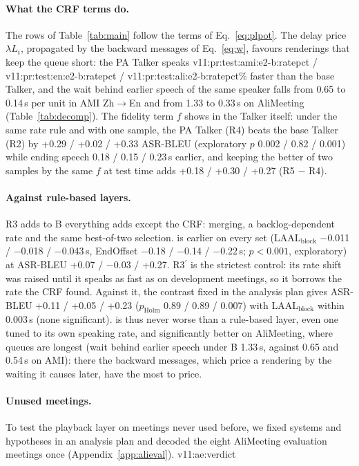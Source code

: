 \paragraph{What the CRF terms do.} The rows of Table~\ref{tab:main} follow the terms of Eq.~\eqref{eq:plpot}. The delay
price $\lambda L_i$, propagated by the backward messages of Eq.~\eqref{eq:w}, favours renderings that keep the queue
short: the PA Talker speaks \num{v11:pr:test:ami:e2-b:ratepct} / \num{v11:pr:test:en:e2-b:ratepct} /
\num{v11:pr:test:ali:e2-b:ratepct}\% faster than the base Talker, and the wait behind earlier speech of the same
speaker falls from 0.65 to 0.14\,s per unit in AMI Zh$\rightarrow$En and from 1.33 to 0.33\,s on AliMeeting
(Table~\ref{tab:decomp}). The fidelity term $f$ shows in the Talker itself: under the same rate rule and with one sample,
the PA Talker (R4) beats the base Talker (R2) by +0.29 / +0.02 / +0.33 ASR-BLEU (exploratory $p$ 0.002 / 0.82 /
0.001) while ending speech 0.18 / 0.15 / 0.23\,s earlier, and keeping the better of two samples by the same $f$ at test
time adds +0.18 / +0.30 / +0.27 (R5 $-$ R4).

\paragraph{Against rule-based layers.} R3 adds to B everything \sys{} adds except the CRF: merging, a backlog-dependent
rate and the same best-of-two selection. \sys{} is earlier on every set (LAAL$_\text{block}$ $-$0.011 / $-$0.018 /
$-$0.043\,s, EndOffset $-$0.18 / $-$0.14 / $-$0.22\,s; $p<0.001$, exploratory) at ASR-BLEU +0.07 / $-$0.03 / +0.27.
R3$^\prime$ is the strictest control: its rate shift was raised until it speaks as fast as \sys{} on development
meetings, so it borrows the rate the CRF found. Against it, the contrast fixed in the analysis plan gives ASR-BLEU
+0.11 / +0.05 / +0.23 ($p_\text{Holm}$ 0.89 / 0.89 / 0.007) with LAAL$_\text{block}$ within 0.003\,s (none
significant). \sys{} is thus never worse than a rule-based layer, even one tuned to its own speaking rate, and
significantly better on AliMeeting, where queues are longest (wait behind earlier speech under B 1.33\,s, against
0.65 and 0.54\,s on AMI): there the backward messages, which price a rendering by the waiting it causes later, have
the most to price.

\ifAliEval
\paragraph{Unused meetings.}
\label{sec:res-alieval}
To test the playback layer on meetings never used before, we fixed systems and hypotheses in an analysis plan and
decoded the eight AliMeeting evaluation meetings once (Appendix~\ref{app:alieval}). \num{v11:ae:verdict}
\fi

